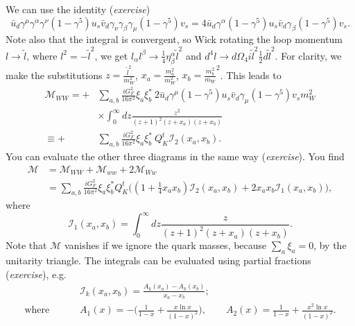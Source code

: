 We can use the identity (\textit{exercise}) 
\begin{equation}
\bar{u}_d \gamma^\mu \gamma^\alpha \gamma^\nu (1-\gamma^5) u_s \bar{v}_d \gamma_\nu \gamma_\beta \gamma_\mu(1-\gamma^5)v_s = 4 \bar{u}_d \gamma^\alpha (1-\gamma^5)u_s \bar{v}_d \gamma_\beta (1-\gamma^5)v_s.
\end{equation}
Note also that the integral is convergent, so Wick rotating the loop momentum $l \to \tilde{l}$, where $l^2 = -\tilde{l}^2$, we get $l_\alpha l^\beta \to \frac{1}{4}\eta^\alpha_\beta \tilde{l}^2$ and $d^4l \to d\Omega_4 i \tilde{l}^2\frac{1}{2}d\tilde{l}^2$. For clarity, we make the substitutions $z=\frac{\tilde{l}^2}{m_W^2}$, $x_a = \frac{m_a^2}{m_W^2}$, $x_b = \frac{m_b^2}{m_W}^2$. This leads to
\begin{equation}
\begin{split}
\mathcal{M}_{WW} = +&\sum_{a,b} \frac{iG_F^2}{16\pi^2} \xi_a \xi_b^*\ 2\bar{u}_d \gamma^\mu (1-\gamma^5) u_s \bar{v}_d \gamma_\mu (1-\gamma^5) v_s m_W^2 \\
&\times \int_0^\infty dz \frac{z^2}{(z+1)^2(z+x_a)(z+x_b)} \\
\equiv +&\sum_{a,b} \frac{iG_F^2}{16\pi^2} \xi_a \xi_b^*\ Q_K^t \mathcal{I}_2(x_a,x_b).
\end{split}
\end{equation}
You can evaluate the other three diagrams in the same way (\textit{exercise}). You find
\begin{equation}
\begin{split}
\mathcal{M} &= \mathcal{M}_{WW} + \mathcal{M}_{ww} + 2\mathcal{M}_{Ww} \\
&= \sum_{a,b} \frac{iG_F^2}{16\pi^2} \xi_a \xi_b^* Q_K^t\bigg((1+\frac{1}{4}x_a x_b)\mathcal{I}_2(x_a,x_b) + 2x_a x_b \mathcal{I}_1(x_a,x_b) \bigg),
\end{split}
\end{equation}
where 
\begin{equation}
\mathcal{I}_1(x_a,x_b) = \int_0^\infty dz \frac{z}{(z+1)^2(z+x_a)(z+x_b)}.
\end{equation}
Note that $\mathcal{M}$ vanishes if we ignore the quark masses, because $\sum_a \xi_a =0$, by the unitarity triangle. The integrals can be evaluated using partial fractions (\textit{exercise}), e.g.
\begin{equation}
\begin{split}
&\mathcal{I}_k(x_a,x_b) = \frac{A_k(x_a)-A_k(x_b)}{x_a-x_b}; \\
\text{where } \qquad &A_1(x) = -\bigg(\frac{1}{1-x} + \frac{x \ln x}{(1-x)^2}\bigg), \qquad A_2(x) = \frac{1}{1-x} + \frac{x^2 \ln x}{(1-x)^2}.
\end{split}
\end{equation}
